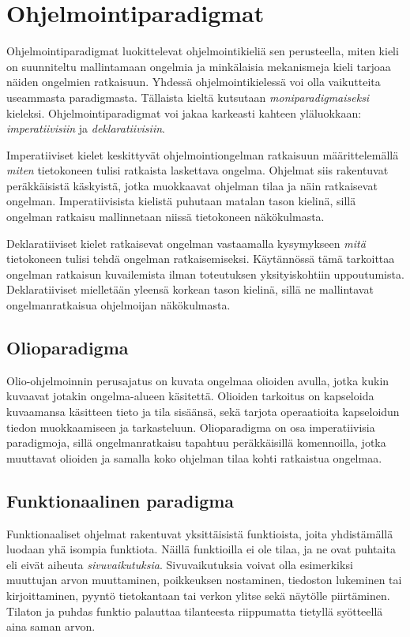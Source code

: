\chapter{Ohjelmointiparadigmat} \label{Ohjelmointiparadigmat}
Ohjelmointiparadigmat luokittelevat ohjelmointikieliä sen perusteella, miten kieli on suunniteltu mallintamaan ongelmia ja minkälaisia mekanismeja kieli tarjoaa näiden ongelmien ratkaisuun. Yhdessä ohjelmointikielessä voi olla vaikutteita useammasta paradigmasta. Tällaista kieltä kutsutaan \textit{moniparadigmaiseksi} kieleksi. Ohjelmointiparadigmat voi jakaa karkeasti kahteen yläluokkaan: \textit{imperatiivisiin} ja \textit{deklaratiivisiin}.
\cite[Luku 6]{principlesAndParadigms}

Imperatiiviset kielet keskittyvät ohjelmointiongelman ratkaisuun määrittelemällä \textit{miten} tietokoneen tulisi ratkaista laskettava ongelma. Ohjelmat siis rakentuvat peräkkäisistä käskyistä, jotka muokkaavat ohjelman tilaa ja näin ratkaisevat ongelman. Imperatiivisista kielistä puhutaan matalan tason kielinä, sillä ongelman ratkaisu mallinnetaan niissä tietokoneen näkökulmasta.
\cite[Luku 1]{programmingLanguagePragmatics} 

Deklaratiiviset kielet ratkaisevat ongelman vastaamalla kysymykseen \textit{mitä} tietokoneen tulisi tehdä ongelman ratkaisemiseksi. Käytännössä tämä tarkoittaa ongelman ratkaisun kuvailemista ilman toteutuksen yksityiskohtiin uppoutumista. Deklaratiiviset mielletään yleensä korkean tason kielinä, sillä ne mallintavat ongelmanratkaisua ohjelmoijan näkökulmasta.
\cite[Luku 1]{programmingLanguagePragmatics}


\section{Olioparadigma}
Olio-ohjelmoinnin perusajatus on kuvata ongelmaa olioiden avulla, jotka kukin kuvaavat jotakin ongelma-alueen käsitettä. Olioiden tarkoitus on kapseloida kuvaamansa käsitteen tieto ja tila sisäänsä, sekä tarjota operaatioita kapseloidun tiedon muokkaamiseen ja tarkasteluun. Olioparadigma on osa imperatiivisia paradigmoja, sillä ongelmanratkaisu tapahtuu peräkkäisillä komennoilla, jotka muuttavat olioiden ja samalla koko ohjelman tilaa kohti ratkaistua ongelmaa. \cite[Luku 1]{programmingLanguagePragmatics}
\cite[Luku 10]{principlesAndParadigms}


\section{Funktionaalinen paradigma}
Funktionaaliset ohjelmat rakentuvat yksittäisistä funktioista, joita yhdistämällä luodaan yhä isompia funktiota. Näillä funktioilla ei ole tilaa, ja ne ovat puhtaita eli eivät aiheuta \textit{sivuvaikutuksia}. Sivuvaikutuksia voivat olla esimerkiksi muuttujan arvon muuttaminen, poikkeuksen nostaminen, tiedoston lukeminen tai kirjoittaminen, pyyntö tietokantaan tai verkon ylitse sekä näytölle piirtäminen. Tilaton ja puhdas funktio palauttaa tilanteesta riippumatta tietyllä syötteellä aina saman arvon. \cite[Luku 1]{functionalProgrammingInScala}

